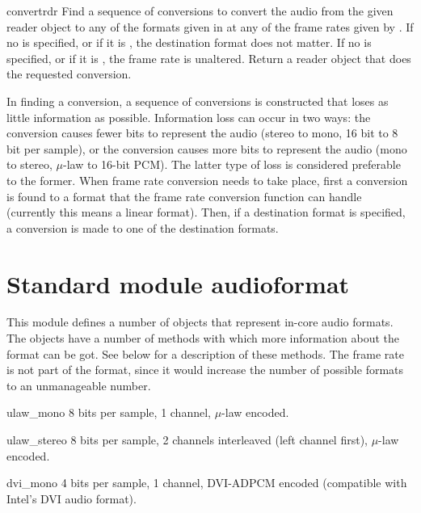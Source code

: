 \begin{funcdesc}{convert}{rdr}
Find a sequence of conversions to convert the audio from the given
reader object  to any of the formats given in 
at any of the frame rates given by .  If no 
is specified, or if it is , the destination format does not
matter.  If no  is specified, or if it is , the
frame rate is unaltered.  Return a reader object that does the
requested conversion.

In finding a conversion, a sequence of conversions is constructed that
loses as little information as possible.  Information loss can occur
in two ways: the conversion causes fewer bits to represent the audio
(stereo to mono, 16 bit to 8 bit per sample), or the conversion causes
more bits to represent the audio (mono to stereo, $\mu$-law to 16-bit
PCM).  The latter type of loss is considered preferable to the former.
When frame rate conversion needs to take place, first a conversion is
found to a format that the frame rate conversion function can handle
(currently this means a linear format).  Then, if a destination format
is specified, a conversion is made to one of the destination formats.
\end{funcdesc}

\section{Standard module audioformat}
\renewcommand{\indexsubitem}{(in module audioformat)}

This module defines a number of objects that represent in-core audio
formats.  The objects have a number of methods with which more
information about the format can be got.  See below for a description
of these methods.  The frame rate is not part of the format, since it
would increase the number of possible formats to an unmanageable
number.

\begin{datadesc}{ulaw_mono}
8 bits per sample, 1 channel, $\mu$-law encoded.
\end{datadesc}

\begin{datadesc}{ulaw_stereo}
8 bits per sample, 2 channels interleaved (left channel first),
$\mu$-law encoded.
\end{datadesc}

\begin{datadesc}{dvi_mono}
4 bits per sample, 1 channel, DVI-ADPCM encoded (compatible with
Intel's DVI audio format).
\end{datadesc}

